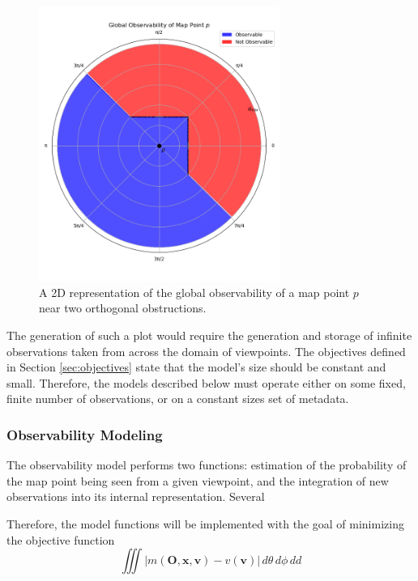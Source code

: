 \begin{figure}[!ht]
    \centering
    \includegraphics[width=0.7\textwidth]{resources/global_observability_p.png}
    \caption[2D Global Observability]{A 2D representation of the global observability of a map point $p$ near two orthogonal obstructions.}
    \label{fig:global_observability_p}
\end{figure}

The generation of such a plot would require the generation and storage of infinite observations taken from across the domain of viewpoints. The objectives defined in Section \ref{sec:objectives} state that the model's size should be constant and small. Therefore, the models described below must operate either on some fixed, finite number of observations, or on a constant sizes set of metadata.

\subsubsection{Observability Modeling}

The observability model performs two functions: estimation of the probability of the map point being seen from a given viewpoint, and the integration of new observations into its internal representation. Several 

Therefore, the model functions will be implemented with the goal of minimizing the objective function
$$
    \iiint |m(\boldsymbol{O},\boldsymbol{x},\boldsymbol{v}) - v(\boldsymbol{v})| \,d\theta\,d\phi\,dd
$$

